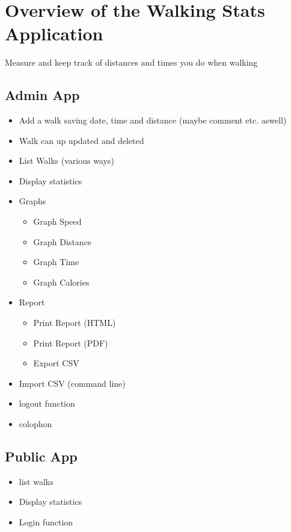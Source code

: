 \documentclass[10pt,a4paper,oneside]{article}
\author{Conor Gilmer}
\begin{document}
\section*{Overview of the Walking Stats Application}
Measure and keep track of distances and times you do when walking

\subsection*{Admin App}
\begin{itemize}
\item Add a walk saving date, time and distance (maybe comment etc. aswell)
\item Walk can up updated and deleted
\item List Walks (various ways)
\item Display statistics
\item Graphs
\begin{itemize}
\item Graph Speed
\item Graph Distance
\item Graph Time
\item Graph Calories
\end{itemize}
\item Report
\begin{itemize}
\item Print Report (HTML)
\item Print Report (PDF)
\item Export CSV
\end{itemize}
\item Import CSV (command line)
\item logout function
\item colophon
\end{itemize}

\subsection*{Public App}
\begin{itemize}
\item list walks
\item Display statistics
\item Login function
\end{itemize}
\end{document}
